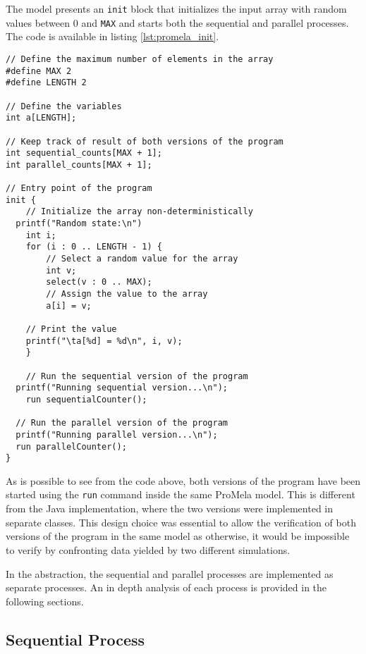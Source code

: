 \documentclass[a4paper, 11pt]{article}
\begin{document}
The model presents an \texttt{init} block that initializes the input array with random values between 0 and \texttt{MAX} and starts both the sequential and parallel processes. The code is available in listing \ref{lst:promela_init}.

\begin{lstlisting}[language=Promela, caption={ProMeLa array initialization and start of sequential and parallel processes}, captionpos=b, breaklines=true, label={lst:promela_init}]
// Define the maximum number of elements in the array
#define MAX 2
#define LENGTH 2

// Define the variables
int a[LENGTH];

// Keep track of result of both versions of the program
int sequential_counts[MAX + 1];
int parallel_counts[MAX + 1];

// Entry point of the program
init {
	// Initialize the array non-deterministically
  printf("Random state:\n")
	int i;
	for (i : 0 .. LENGTH - 1) {
		// Select a random value for the array
		int v;
		select(v : 0 .. MAX);
		// Assign the value to the array
		a[i] = v;

    // Print the value
    printf("\ta[%d] = %d\n", i, v);
	}

	// Run the sequential version of the program
  printf("Running sequential version...\n");
	run sequentialCounter();
 
  // Run the parallel version of the program
  printf("Running parallel version...\n");
  run parallelCounter();
}
\end{lstlisting}

\noindent As is possible to see from the code above, both versions of the program have been started using the \texttt{run} command inside the same ProMela model. This is different from the Java implementation, where the two versions were implemented in separate classes. This design choice was essential to allow the verification of both versions of the program in the same model as otherwise, it would be impossible to verify by confronting data yielded by two different simulations.

In the abstraction, the sequential and parallel processes are implemented as separate processes. An in depth analysis of each process is provided in the following sections.

\subsection{Sequential Process}
\end{document}
